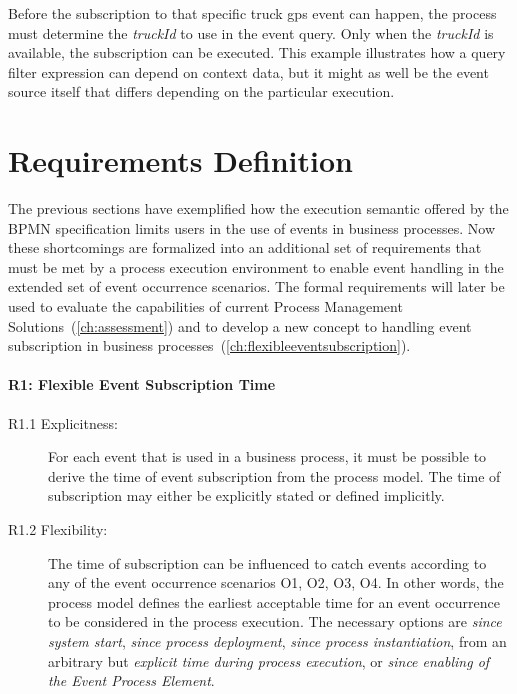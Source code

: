 Before the subscription to that specific truck gps event can happen, the process must determine the \textit{truckId} to use in the event query. Only when the \textit{truckId} is available, the subscription can be executed. This example illustrates how a query filter expression can depend on context data, but it might as well be the event source itself that differs depending on the particular execution.





\section{Requirements Definition}

The previous sections have exemplified how the execution semantic offered by the BPMN specification limits users in the use of events in business processes. Now these shortcomings are formalized into an additional set of requirements that must be met by a process execution environment to enable event handling in the extended set of event occurrence scenarios.
The formal requirements will later be used to evaluate the capabilities of current Process Management Solutions~(\autoref{ch:assessment}) and to develop a new concept to handling event subscription in business processes~(\autoref{ch:flexibleeventsubscription}).

\paragraph{R1: Flexible Event Subscription Time}

\begin{description}
	\item[R1.1 Explicitness:] 
	For each event that is used in a business process, it must be possible to derive the time of event subscription from the process model. The time of subscription may either be explicitly stated or defined implicitly.
	\item[R1.2 Flexibility:] 
	The time of subscription can be influenced to catch events according to any of the event occurrence scenarios O1, O2, O3, O4. In other words, the process model defines the earliest acceptable time for an event occurrence to be considered in the process execution. The necessary options are \textit{since system start}, \textit{since process deployment}, \textit{since process instantiation}, from an arbitrary but \textit{explicit time during process execution}, or \textit{since enabling of the Event Process Element}.
\end{description}


